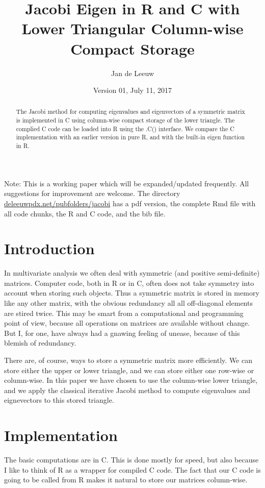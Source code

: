 \documentclass[12pt,]{article}
\title{Jacobi Eigen in R and C with Lower Triangular Column-wise Compact
Storage}
\author{Jan de Leeuw}
\date{Version 01, July 11, 2017}
\begin{document}
\maketitle
\begin{abstract}
The Jacobi method for computing eigenvalues and eigenvectors of a
symmetric matrix is implemented in C using column-wise compact storage
of the lower triangle. The complied C code can be loaded into R using
the .C() interface. We compare the C implementation with an earlier
version in pure R, and with the built-in eigen function in R.
\end{abstract}

{
\setcounter{tocdepth}{3}
\tableofcontents
}
Note: This is a working paper which will be expanded/updated frequently.
All suggestions for improvement are welcome. The directory
\href{http://deleeuwpdx.net/pubfolders/jacobi}{deleeuwpdx.net/pubfolders/jacobi}
has a pdf version, the complete Rmd file with all code chunks, the R and
C code, and the bib file.

\section{Introduction}\label{introduction}

In multivariate analysis we often deal with symmetric (and positive
semi-definite) matrices. Computer code, both in R or in C, often does
not take symmetry into account when storing such objects. Thus a
symmetric matrix is stored in memory like any other matrix, with the
obvious redundancy all all off-diagonal elements are stired twice. This
may be smart from a computational and programming point of view, because
all operations on matrices are available without change. But I, for one,
have always had a gnawing feeling of unease, because of this blemish of
redundancy.

There are, of course, ways to store a symmetric matrix more efficiently.
We can store either the upper or lower triangle, and we can store either
one row-wise or column-wise. In this paper we have chosen to use the
column-wise lower triangle, and we apply the classical iterative Jacobi
method to compute eigenvalues and eignevectors to this stored triangle.

\section{Implementation}\label{implementation}

The basic computations are in C. This is done mostly for speed, but also
because I like to think of R as a wrapper for compiled C code. The fact
that our C code is going to be called from R makes it natural to store
our matrices column-wise.
\end{document}
